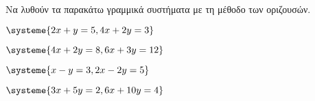 Να λυθούν τα παρακάτω γραμμικά συστήματα με τη μέθοδο των οριζουσών.
\begin{multicols}{2}
\begin{rlist}[leftmargin=5mm]
\item $ \systeme{2x+y=5,4x+2y=3} $
\item $ \systeme{4x+2y=8,6x+3y=12} $
\item $ \systeme{x-y=3,2x-2y=5} $
\item $ \systeme{3x+5y=2,6x+10y=4} $
\end{rlist}
\end{multicols}
